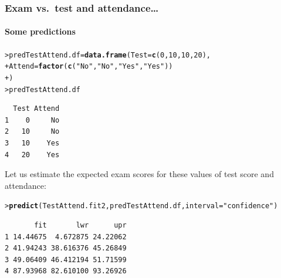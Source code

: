 \documentclass{beamer}\usepackage[]{graphicx}\usepackage[]{xcolor}
\makeatletter
\newcommand{\hlnum}[1]{\textcolor[rgb]{0.686,0.059,0.569}{#1}}%
\newcommand{\hlstr}[1]{\textcolor[rgb]{0.192,0.494,0.8}{#1}}%
\newcommand{\hlstd}[1]{\textcolor[rgb]{0.345,0.345,0.345}{#1}}%
\newcommand{\hlkwb}[1]{\textcolor[rgb]{0.69,0.353,0.396}{#1}}%
\newcommand{\hlkwc}[1]{\textcolor[rgb]{0.333,0.667,0.333}{#1}}%
\newcommand{\hlkwd}[1]{\textcolor[rgb]{0.737,0.353,0.396}{\textbf{#1}}}%
\newenvironment{kframe}{%
 \def\at@end@of@kframe{}%
 \ifinner\ifhmode%
  \def\at@end@of@kframe{\end{minipage}}%
  \begin{minipage}{\columnwidth}%
 \fi\fi%
 \def\FrameCommand##1{\hskip\@totalleftmargin \hskip-\fboxsep
 \colorbox{shadecolor}{##1}\hskip-\fboxsep
     \hskip-\linewidth \hskip-\@totalleftmargin \hskip\columnwidth}%
 \MakeFramed {\advance\hsize-\width
   \@totalleftmargin\z@ \linewidth\hsize
   \@setminipage}}%
 {\par\unskip\endMakeFramed%
 \at@end@of@kframe}
\newenvironment{knitrout}{}{} %
\makeatother
\begin{document}
\begin{frame}[fragile]
\frametitle{Exam vs.\ test \textbf{and} attendance\ldots}
\framesubtitle{Some predictions}
\begin{knitrout}\scriptsize
{}\color{fgcolor}\begin{kframe}
\begin{alltt}
\hlstd{> }\hlstd{predTestAttend.df} \hlkwb{=} \hlkwd{data.frame}\hlstd{(}\hlkwc{Test} \hlstd{=} \hlkwd{c}\hlstd{(}\hlnum{0}\hlstd{,} \hlnum{10}\hlstd{,} \hlnum{10}\hlstd{,} \hlnum{20}\hlstd{),}
\hlstd{+ }                               \hlkwc{Attend} \hlstd{=} \hlkwd{factor}\hlstd{(}\hlkwd{c}\hlstd{(}\hlstr{"No"}\hlstd{,} \hlstr{"No"}\hlstd{,} \hlstr{"Yes"}\hlstd{,} \hlstr{"Yes"}\hlstd{))}
\hlstd{+ }                               \hlstd{)}
\hlstd{> }\hlstd{predTestAttend.df}
\end{alltt}
\begin{verbatim}
  Test Attend
1    0     No
2   10     No
3   10    Yes
4   20    Yes
\end{verbatim}
\end{kframe}
\end{knitrout}
\bigskip
Let us estimate the expected exam scores for these values of test score and attendance:\\
\bigskip
\begin{knitrout}\scriptsize
{}\color{fgcolor}\begin{kframe}
\begin{alltt}
\hlstd{> }\hlkwd{predict}\hlstd{(TestAttend.fit2,predTestAttend.df,} \hlkwc{interval}\hlstd{=}\hlstr{"confidence"}\hlstd{)}
\end{alltt}
\begin{verbatim}
       fit       lwr      upr
1 14.44675  4.672875 24.22062
2 41.94243 38.616376 45.26849
3 49.06409 46.412194 51.71599
4 87.93968 82.610100 93.26926
\end{verbatim}
\end{kframe}
\end{knitrout}
\end{frame}
\end{document}
